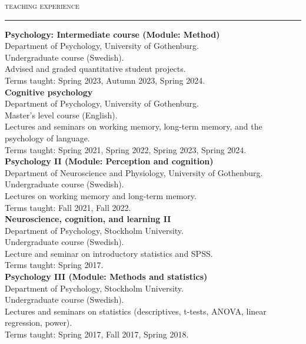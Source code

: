 \documentclass[11pt]{article}
\newcommand{\RR}{\textcolor{grayrule}{\rule[3mm]{\textwidth}{0.5pt}}}
\newcommand{\oneline}{\\[1\baselineskip]}
\begin{document}
 
%

\textsc{\Large teaching experience}  \\
\vspace{-.3cm}\RR 

\textbf{Psychology: Intermediate course (Module: Method)} \\
Department of Psychology, University of Gothenburg. \\
Undergraduate course (Swedish). \\Advised and graded quantitative student projects. \\Terms taught: Spring 2023, Autumn 2023, Spring 2024.  \oneline
\textbf{Cognitive psychology} \\
Department of Psychology, University of Gothenburg. \\
Master's level course (English). \\Lectures and seminars on working memory, long-term memory, and the psychology of language. \\
Terms taught: Spring 2021, Spring 2022, Spring 2023, Spring 2024.  \oneline
\textbf{Psychology II (Module: Perception and cognition)} \\
Department of Neuroscience and Physiology, University of Gothenburg. \\
Undergraduate course (Swedish). \\ Lectures on working memory and long-term memory.\\
Terms taught: Fall 2021, Fall 2022. \oneline
\textbf{Neuroscience, cognition, and learning II} \\
Department of Psychology, Stockholm University.\\
Undergraduate course (Swedish). \\Lecture and seminar on introductory statistics and SPSS.\\
Terms taught: Spring 2017.\oneline
\textbf{Psychology III (Module: Methods and statistics)} \\
Department of Psychology, Stockholm University. \\
Undergraduate course (Swedish). \\ Lectures and seminars on statistics (descriptives, t-tests, ANOVA, linear regression, power). \\
Terms taught: Spring 2017, Fall 2017, Spring 2018. \\
\end{document}
